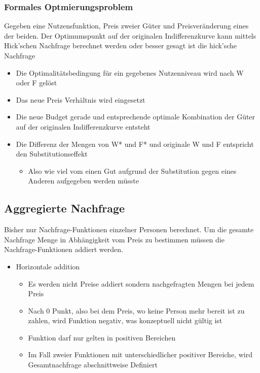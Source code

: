 \subsubsection{Formales Optmierungsproblem}
Gegeben eine Nutzensfunktion, Preis zweier Güter und Preisveränderung eines der beiden. Der Optimumspunkt auf der originalen Indifferenzkurve kann mittels Hick'schen Nachfrage berechnet werden oder besser gesagt ist die hick'sche Nachfrage
\begin{itemize}
    \item Die Optimalitätsbedingung für ein gegebenes Nutzenniveau wird nach W oder F gelöst 
    \item Das neue Preis Verhältnis wird eingesetzt
    \item Die neue Budget gerade und entsprechende optimale Kombination der Güter auf der originalen Indifferenzkurve entsteht
    \item Die Differenz der Mengen von W* und F* und originale W und F entspricht den Substitutionseffekt
    \begin{itemize}
        \item Also wie viel vom einen Gut aufgrund der Substitution gegen eines Anderen aufgegeben werden müsste
    \end{itemize}
\end{itemize}

\subsection{Aggregierte Nachfrage}
Bisher nur Nachfrage-Funktionen einzelner Personen berechnet. Um die gesamte Nachfrage Menge in Abhängigkeit vom Preis zu bestimmen müssen die Nachfrage-Funktionen addiert werden.
\begin{itemize}
    \item Horizontale addition 
    \begin{itemize}
        \item Es werden nicht Preise addiert sondern nachgefragten Mengen bei jedem Preis
        \item Nach 0 Punkt, also bei dem Preis, wo keine Person mehr bereit ist zu zahlen, wird Funktion negativ, was konzeptuell nicht gültig ist
        \item Funktion darf nur gelten in positiven Bereichen
        \item Im Fall zweier Funktionen mit unterschiedlicher positiver Bereiche, wird Gesamtnachfrage abschnittweise Definiert 
    \end{itemize}
\end{itemize} 
